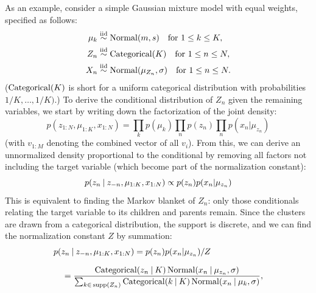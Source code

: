 As an example, consider a simple Gaussian mixture model with equal weights, specified as follows:
\begin{equation}
  \label{eq:normal-mixture-1}
  \begin{aligned}
    \mu_{k} &\stackrel{\text{iid}}{\sim} \mathrm{Normal}(m, s) \quad\text{for } 1 \le k \le K, \\
    Z_{n} &\stackrel{\text{iid}}{\sim} \mathrm{Categorical}(K) \quad\text{for } 1 \le n \le N, \\
    X_{n} &\stackrel{\text{iid}}{\sim} \mathrm{Normal}(\mu_{Z_{n}}, \sigma) \quad\text{for } 1 \le n \le N.
  \end{aligned}
\end{equation}
(\(\mathrm{Categorical}(K)\) is short for a uniform categorical distribution with probabilities
\(1/K, \ldots, 1/K)\).)  To derive the conditional distribution of \(Z_{n}\) given the remaining
variables, we start by writing down the factorization of the joint density:
\begin{equation}
  p(z_{1:N}, \mu_{1:K}, x_{1:N}) = \prod_{k} p(\mu_{k}) \prod_{n} p(z_{n}) \prod_{n} p(x_{n} | \mu_{z_{n}})
\end{equation}
(with \(v_{1:M}\) denoting the combined vector of all \(v_{i}\)). From this, we can derive an
unnormalized density proportional to the conditional by removing all factors not including the
target variable (which become part of the normalization constant):
\begin{equation}
    p(z_{n} \:\vert\: z_{-n}, \mu_{1:K}, x_{1:N}) \propto p(z_{n}) p(x_{n} | \mu_{z_{n}})
\end{equation}
This is equivalent to finding the Markov blanket of \(Z_{n}\): only those conditionals relating the
target variable to its children and parents remain.  Since the clusters are drawn from a categorical
distribution, the support is discrete, and we can find the normalization constant \(Z\) by
summation:
\begin{equation}
  \setlength{\jot}{0.8\baselineskip}
  \begin{aligned}
    &p(z_{n} \given z_{-n}, \mu_{1:K}, x_{1:N}) = p(z_{n}) p(x_{n} | \mu_{z_{n}}) / Z  \\
    &\quad = \dfrac{\distr{Categorical}(z_{n} \given K) \, \Normal(x_{n} \given \mu_{z_{n}}, \sigma)}{
      \sum_{k \in\, \supp(Z_{n})} \distr{Categorical}(k \given K)\, \Normal(x_{n} \given \mu_{k},
      \sigma)}, \\
  \end{aligned}
\end{equation}

